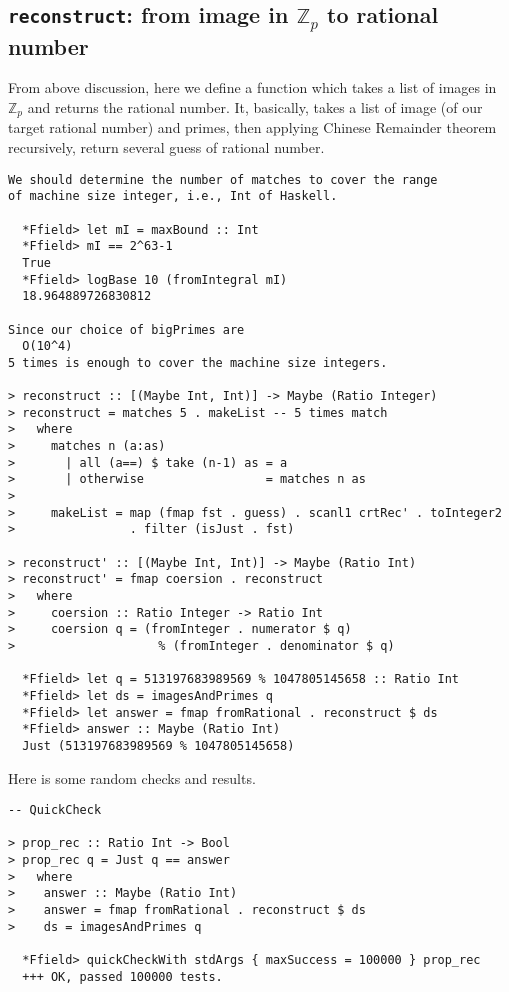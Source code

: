 \documentclass[11pt]{book}
\begin{document}
\subsection{\texttt{reconstruct}: from image in $\mathbb{Z}_p$ to rational number}
From above discussion, here we define a function which takes a list of images in $\mathbb{Z}_p$ and returns the rational number.
It, basically, takes a list of image (of our target rational number) and primes, then applying Chinese Remainder theorem recursively, return several guess of rational number.

\begin{verbatim}
We should determine the number of matches to cover the range 
of machine size integer, i.e., Int of Haskell.

  *Ffield> let mI = maxBound :: Int
  *Ffield> mI == 2^63-1
  True
  *Ffield> logBase 10 (fromIntegral mI)
  18.964889726830812

Since our choice of bigPrimes are
  O(10^4)
5 times is enough to cover the machine size integers.

> reconstruct :: [(Maybe Int, Int)] -> Maybe (Ratio Integer)
> reconstruct = matches 5 . makeList -- 5 times match
>   where
>     matches n (a:as)
>       | all (a==) $ take (n-1) as = a
>       | otherwise                 = matches n as
>
>     makeList = map (fmap fst . guess) . scanl1 crtRec' . toInteger2 
>                . filter (isJust . fst)

> reconstruct' :: [(Maybe Int, Int)] -> Maybe (Ratio Int)
> reconstruct' = fmap coersion . reconstruct
>   where
>     coersion :: Ratio Integer -> Ratio Int
>     coersion q = (fromInteger . numerator $ q) 
>                    % (fromInteger . denominator $ q)

  *Ffield> let q = 513197683989569 % 1047805145658 :: Ratio Int
  *Ffield> let ds = imagesAndPrimes q
  *Ffield> let answer = fmap fromRational . reconstruct $ ds
  *Ffield> answer :: Maybe (Ratio Int)
  Just (513197683989569 % 1047805145658)
\end{verbatim}

Here is some random checks and results.

\begin{verbatim}
-- QuickCheck

> prop_rec :: Ratio Int -> Bool
> prop_rec q = Just q == answer
>   where
>    answer :: Maybe (Ratio Int)
>    answer = fmap fromRational . reconstruct $ ds
>    ds = imagesAndPrimes q

  *Ffield> quickCheckWith stdArgs { maxSuccess = 100000 } prop_rec 
  +++ OK, passed 100000 tests.
\end{verbatim}
\end{document}
